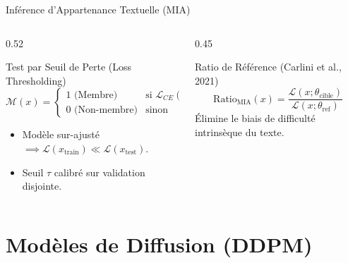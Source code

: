 \documentclass[aspectratio=169, 10pt, table]{beamer}
\begin{document}
\begin{frame}{Inférence d'Appartenance Textuelle (MIA)}
    \begin{columns}[T]
        \begin{column}{0.52\textwidth}
            \begin{block}{Test par Seuil de Perte (Loss Thresholding)}
                \scriptsize
                $$\mathcal{M}(x) = \begin{cases} 1 \text{ (Membre)} & \text{si } \mathcal{L}_{CE}(x; \theta) \le \tau \\ 0 \text{ (Non-membre)} & \text{sinon} \end{cases}$$
            \end{block}
            \small
            \begin{itemize}
                \item Modèle sur-ajusté $\implies \mathcal{L}(x_{\text{train}}) \ll \mathcal{L}(x_{\text{test}})$.
                \item Seuil $\tau$ calibré sur validation disjointe.
            \end{itemize}
        \end{column}

        \begin{column}{0.45\textwidth}
            \begin{alertblock}{Ratio de Référence (Carlini et al., 2021)}
                \scriptsize
                $$\text{Ratio}_{\text{MIA}}(x) = \frac{\mathcal{L}(x; \theta_{\text{cible}})}{\mathcal{L}(x; \theta_{\text{ref}})}$$
                \small
                Élimine le biais de difficulté intrinsèque du texte.
            \end{alertblock}
        \end{column}
    \end{columns}
\end{frame}

\section{Modèles de Diffusion (DDPM)}
\end{document}
